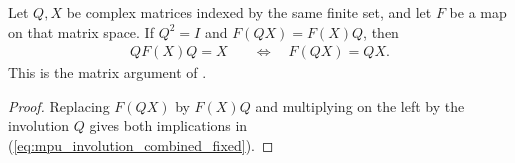 \begin{lemma}
    \label{thm:mpu_involution_combined_fixed_equation}
    \leanok
    Let $Q,X$ be complex matrices indexed by the same finite set, and let
    $F$ be a map on that matrix space. If $Q^2=I$ and
    $F(QX)=F(X)Q$, then
    \begin{align}
        QF(X)Q=X
         & \quad\Longleftrightarrow\quad F(QX)=QX.
        \label{eq:mpu_involution_combined_fixed}
    \end{align}
    This is the matrix argument of \cite[lines~1295--1322]{Cirac2017MPU}.
\end{lemma}

\begin{proof}\leanok
    Replacing $F(QX)$ by $F(X)Q$ and multiplying on the left by the
    involution $Q$ gives both implications in
    (\ref{eq:mpu_involution_combined_fixed}).
\end{proof}
